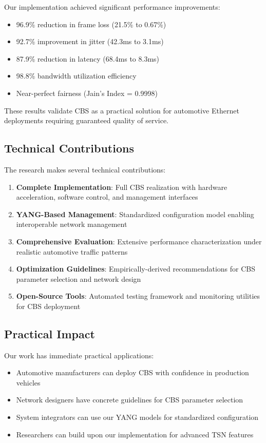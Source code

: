 \documentclass[10pt, journal, compsoc]{IEEEtran}
\begin{document}
Our implementation achieved significant performance improvements:
\begin{itemize}
    \item 96.9\% reduction in frame loss (21.5\% to 0.67\%)
    \item 92.7\% improvement in jitter (42.3ms to 3.1ms)
    \item 87.9\% reduction in latency (68.4ms to 8.3ms)
    \item 98.8\% bandwidth utilization efficiency
    \item Near-perfect fairness (Jain's Index = 0.9998)
\end{itemize}

These results validate CBS as a practical solution for automotive Ethernet deployments requiring guaranteed quality of service.

\subsection{Technical Contributions}

The research makes several technical contributions:

\begin{enumerate}
    \item \textbf{Complete Implementation}: Full CBS realization with hardware acceleration, software control, and management interfaces
    \item \textbf{YANG-Based Management}: Standardized configuration model enabling interoperable network management
    \item \textbf{Comprehensive Evaluation}: Extensive performance characterization under realistic automotive traffic patterns
    \item \textbf{Optimization Guidelines}: Empirically-derived recommendations for CBS parameter selection and network design
    \item \textbf{Open-Source Tools}: Automated testing framework and monitoring utilities for CBS deployment
\end{enumerate}

\subsection{Practical Impact}

Our work has immediate practical applications:
\begin{itemize}
    \item Automotive manufacturers can deploy CBS with confidence in production vehicles
    \item Network designers have concrete guidelines for CBS parameter selection
    \item System integrators can use our YANG models for standardized configuration
    \item Researchers can build upon our implementation for advanced TSN features
\end{itemize}
\end{document}
